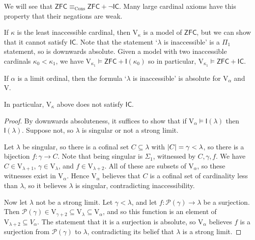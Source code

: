 We will see that \( \mathsf{ZFC} \equiv_{\mathrm{Cons}} \mathsf{ZFC} + \neg\mathsf{IC} \).
Many large cardinal axioms have this property that their negations are weak.

If \( \kappa \) is the least inaccessible cardinal, then \( \mathrm{V}_\kappa \) is a model of \( \mathsf{ZFC} \), but we can show that it cannot satisfy \( \mathsf{IC} \).
Note that the statement `\( \lambda \) is inaccessible' is a \( \Pi_1 \) statement, so is downwards absolute.
Given a model with two inaccessible cardinals \( \kappa_0 < \kappa_1 \), we have \( \mathrm{V}_{\kappa_1} \vDash \mathsf{ZFC} + \mathsf{I}(\kappa_0) \) so in particular, \( \mathrm{V}_{\kappa_1} \vDash \mathsf{ZFC} + \mathsf{IC} \).
\begin{lemma}
    If \( \alpha \) is a limit ordinal, then the formula `\( \lambda \) is inaccessible' is absolute for \( \mathrm{V}_\alpha \) and \( \mathrm{V} \).
\end{lemma}
In particular, \( \mathrm{V}_\kappa \) above does not satisfy \( \mathsf{IC} \).
\begin{proof}
    By downwards absoluteness, it suffices to show that if \( \mathrm{V}_\alpha \vDash \mathsf{I}(\lambda) \) then \( \mathsf{I}(\lambda) \).
    Suppose not, so \( \lambda \) is singular or not a strong limit.

    Let \( \lambda \) be singular, so there is a cofinal set \( C \subseteq \lambda \) with \( \abs{C} = \gamma < \lambda \), so there is a bijection \( f : \gamma \to C \).
    Note that being singular is \( \Sigma_1 \), witnessed by \( C, \gamma, f \).
    We have \( C \in \mathrm{V}_{\lambda + 1} \), \( \gamma \in \mathrm{V}_\lambda \), and \( f \in \mathrm{V}_{\lambda + 2} \).
    All of these are subsets of \( \mathrm{V}_\alpha \), so these witnesses exist in \( \mathrm{V}_\alpha \).
    Hence \( \mathrm{V}_\alpha \) believes that \( C \) is a cofinal set of cardinality less than \( \lambda \), so it believes \( \lambda \) is singular, contradicting inaccessibility.

    Now let \( \lambda \) not be a strong limit.
    Let \( \gamma < \lambda \), and let \( f : \mathcal P(\gamma) \to \lambda \) be a surjection.
    Then \( \mathcal P(\gamma) \in \mathrm{V}_{\gamma + 2} \subseteq \mathrm{V}_\lambda \subseteq \mathrm{V}_\alpha \), and so this function is an element of \( \mathrm{V}_{\lambda + 2} \subseteq V_\alpha \).
    The statement that it is a surjection is absolute, so \( \mathrm{V}_\alpha \) believes \( f \) is a surjection from \( \mathcal P(\gamma) \) to \( \lambda \), contradicting its belief that \( \lambda \) is a strong limit.
\end{proof}
